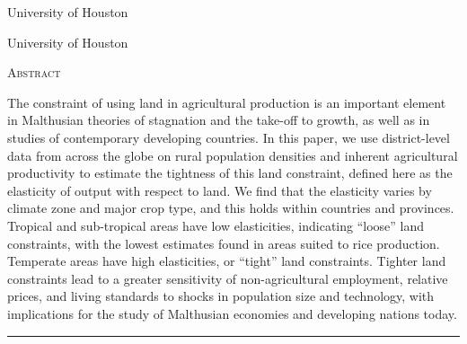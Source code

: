 \documentclass[11pt]{article}
\begin{document}
\begin{titlepage}
\vspace{2in} \noindent {\large \today}

\vspace{.5in} 

\vspace{.25in} 

\vspace{.05in} \noindent University of Houston

\vspace{.25in} 

\vspace{.05in} \noindent University of Houston

\vfill \noindent \textsc{Abstract} \hrulefill

\vspace{.05in} \noindent The constraint of using land in agricultural production is an important element in Malthusian theories of stagnation and the take-off to growth, as well as in studies of contemporary developing countries. In this paper, we use district-level data from across the globe on rural population densities and inherent agricultural productivity to estimate the tightness of this land constraint, defined here as the elasticity of output with respect to land. We find that the elasticity varies by climate zone and major crop type, and this holds within countries and provinces. Tropical and sub-tropical areas have low elasticities, indicating ``loose'' land constraints, with the lowest estimates found in areas suited to rice production. Temperate areas have high elasticities, or ``tight'' land constraints. Tighter land constraints lead to a greater sensitivity of non-agricultural employment, relative prices, and living standards to shocks in population size and technology, with implications for the study of Malthusian economies and developing nations today.

\vspace{.1in} \hrule

\vspace{.5in} 

\vspace{.1in} 

\vspace{.1in} 
\end{titlepage}
\end{document}
